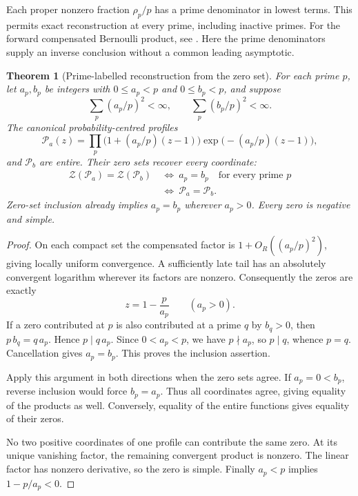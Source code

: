 \documentclass[11pt]{article}
\newtheorem{theorem}{Theorem}[section]
\theoremstyle{definition}
\begin{document}
Each proper nonzero fraction $\rho_p/p$ has a prime denominator in lowest
terms. This permits exact reconstruction at every prime, including inactive
primes. For the forward compensated Bernoulli product, see
\cite[Proposition~3.1]{KN}. Here the prime denominators supply an inverse
conclusion without a common leading asymptotic.

\begin{theorem}[Prime-labelled reconstruction from the zero set]
\label{thm:prime-denominator-profile-rigidity}
For each prime $p$, let $a_p,b_p$ be integers with
$0\le a_p<p$ and $0\le b_p<p$, and suppose
\[
 \sum_p(a_p/p)^2<\infty,\qquad \sum_p(b_p/p)^2<\infty.
\]
The canonical probability-centred profiles
\[
 \mathcal P_a(z)=
 \prod_p\bigl(1+(a_p/p)(z-1)\bigr)
           \exp\bigl(-(a_p/p)(z-1)\bigr),
\]
and $\mathcal P_b$ are entire. Their zero sets recover every coordinate:
\[
 \begin{aligned}
 \mathcal Z(\mathcal P_a)=\mathcal Z(\mathcal P_b)
 &\ \Longleftrightarrow\ a_p=b_p\quad\text{for every prime }p\\
 &\ \Longleftrightarrow\ \mathcal P_a=\mathcal P_b.
 \end{aligned}
\]
Zero-set inclusion already implies $a_p=b_p$ wherever $a_p>0$.
Every zero is negative and simple.
\end{theorem}

\begin{proof}
On each compact set the compensated factor is
$1+O_R((a_p/p)^2)$, giving locally uniform convergence.
A sufficiently late tail has an absolutely convergent logarithm wherever
its factors are nonzero. Consequently the zeros are exactly
\[
 z=1-\frac{p}{a_p}\qquad(a_p>0).
\]
If a zero contributed at $p$ is also contributed at a prime $q$ by
$b_q>0$, then $p\,b_q=q\,a_p$. Hence $p\mid q\,a_p$.
Since $0<a_p<p$, we have $p\nmid a_p$, so $p\mid q$, whence $p=q$.
Cancellation gives $a_p=b_p$. This proves the inclusion assertion.

Apply this argument in both directions when the zero sets agree.
If $a_p=0<b_p$, reverse inclusion would force $b_p=a_p$.
Thus all coordinates agree, giving equality of the products as well.
Conversely, equality of the entire functions gives equality of their zeros.

No two positive coordinates of one profile can contribute the same zero.
At its unique vanishing factor, the remaining convergent product is
nonzero. The linear factor has nonzero derivative, so the zero is simple.
Finally $a_p<p$ implies $1-p/a_p<0$.
\end{proof}
\end{document}
